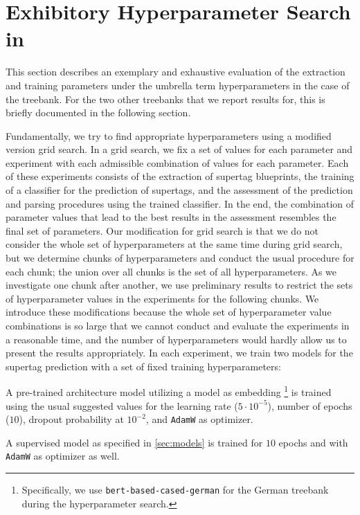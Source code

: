 \documentclass[../../document.tex]{subfiles}
\begin{document}
    \section{Exhibitory Hyperparameter Search in }\label{sec:gridsearch}
    This section describes an exemplary and exhaustive evaluation of the extraction and training parameters under the umbrella term hyperparameters in the case of the \negra{} treebank.
    For the two other treebanks that we report results for, this is briefly documented in the following section.
    
    Fundamentally, we try to find appropriate hyperparameters using a modified version grid search.
    In a grid search, we fix a set of values for each parameter and experiment with each admissible combination of values for each parameter.
    Each of these experiments consists of the extraction of supertag blueprints, the training of a classifier for the prediction of supertags, and the assessment of the prediction and parsing procedures using the trained classifier.
    In the end, the combination of parameter values that lead to the best results in the assessment resembles the final set of parameters.
    Our modification for grid search is that we do not consider the whole set of hyperparameters at the same time during grid search, but we determine chunks of hyperparameters and conduct the usual procedure for each chunk; the union over all chunks is the set of all hyperparameters.
    As we investigate one chunk after another, we use preliminary results to restrict the sets of hyperparameter values in the experiments for the following chunks.
    We introduce these modifications because the whole set of hyperparameter value combinations is so large that we cannot conduct and evaluate the experiments in a reasonable time, and the number of hyperparameters would hardly allow us to present the results appropriately.
    In each experiment, we train two models for the supertag prediction with a set of fixed training hyperparameters:
    \begin{compactitem}
        \item A pre-trained architecture model utilizing a  model as embedding \footnote{
            Specifically, we use \texttt{bert-based-cased-german} for the German \negra{} treebank during the hyperparameter search.
        } is trained using the usual suggested values for the learning rate ($5\cdot 10^{-5}$), number of epochs ($10$), dropout probability at \(10^{-2}\), and \texttt{AdamW} as optimizer.
        \item A supervised model as specified in \cref{sec:models} is trained for $10$ epochs and with \texttt{AdamW} as optimizer as well.
    \end{compactitem}
\end{document}
